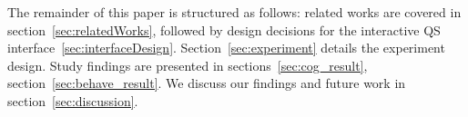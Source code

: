 The remainder of this paper is structured as follows: related works are covered in section~\ref{sec:relatedWorks}, followed by design decisions for the interactive QS interface~\ref{sec:interfaceDesign}. Section~\ref{sec:experiment} details the experiment design. Study findings are presented in sections~\ref{sec:cog_result}, section~\ref{sec:behave_result}. We discuss our findings and future work in section~\ref{sec:discussion}.


 


